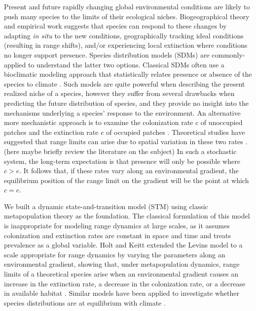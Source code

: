 \documentclass[11pt]{article}
\begin{document}
Present and future rapidly changing global environmental conditions are likely to push many species to the limits of their ecological niches.
Biogeographical theory and empirical work suggests that species can respond to these changes by adapting \emph{in situ} to the new conditions, geographically tracking ideal conditions (resulting in range shifts), and/or experiencing local extinction where conditions no longer support presence.
Species distribution models (SDMs) are commonly-applied to understand the latter two options.
Classical SDMs often use a bioclimatic modeling approach that statistically relates presence or absence of the species to climate \cite{Guisan2005}.
Such models are quite powerful when describing the present realized niche of a species, however they suffer from several drawbacks when predicting the future distribution of species, and they provide no insight into the mechanisms underlying a species' response to the environment.
An alternative more mechanistic approach is to examine the colonization rate $c$ of unoccupied patches and the extinction rate $e$ of occupied patches \cite{Yackulic2015}.
Theoretical studies have suggested that range limits can arise due to spatial variation in these two rates \cite{Holt2000, Holt2005}.
(here maybe briefly review the literature on the subject)
In such a stochastic system, the long-term expectation is that presence will only be possible where $c > e$.
It follows that, if these rates vary along an environmental gradient, the equilibrium position of the range limit on the gradient will be the point at which $c = e$.

We built a dynamic state-and-transition model (STM) using classic metapopulation theory \cite{Levins1969} as the foundation.
The classical formulation of this model is inappropriate for modeling range dynamics at large scales, as it assumes colonization and extinction rates are constant in space and time and treats prevalence as a global variable.
Holt and Keitt extended the Levins model to a scale appropriate for range dynamics by varying the parameters along an environmental gradient, showing that, under metapopulation dynamics, range limits of a theoretical species arise when an environmental gradient causes an increase in the extinction rate, a decrease in the colonization rate, or a decrease in available habitat \cite{Holt2000}.
Similar models have been applied to investigate whether species distributions are at equilibrium with climate \cite{Garcia2013}.
\end{document}
